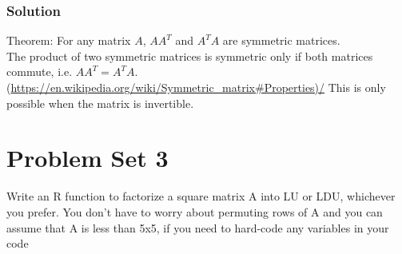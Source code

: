 \documentclass[]{article}
\begin{document}
\subsubsection{Solution}\label{solution-1}

Theorem: For any matrix \(A\), \(AA^T\) and \(A^TA\) are symmetric
matrices.\\
The product of two symmetric matrices is symmetric only if both matrices
commute, i.e. \(AA^T = A^TA\).\\
(\url{https://en.wikipedia.org/wiki/Symmetric_matrix\#Properties)/} This
is only possible when the matrix is invertible.

\section{Problem Set 3}\label{problem-set-3}

Write an R function to factorize a square matrix A into LU or LDU,
whichever you prefer. You don't have to worry about permuting rows of A
and you can assume that A is less than 5x5, if you need to hard-code any
variables in your code
\end{document}
